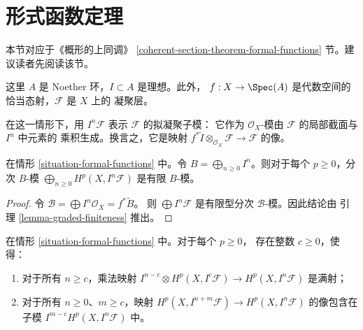 \section{形式函数定理}
\label{section-theorem-formal-functions}

\noindent
本节对应于《概形的上同调》
\ref{coherent-section-theorem-formal-functions} 节。建议读者先阅读该节。

\begin{situation}
\label{situation-formal-functions}
这里 $A$ 是 Noether 环，$I \subset A$ 是理想。此外，
$f : X \to \Spec(A)$ 是代数空间的恰当态射，$\mathcal{F}$ 是 $X$ 上的
凝聚层。
\end{situation}

\noindent
在这一情形下，用 $I^n\mathcal{F}$ 表示 $\mathcal{F}$ 的拟凝聚子模：
它作为 $\mathcal{O}_X$-模由 $\mathcal{F}$ 的局部截面与 $I^n$ 中元素的
乘积生成。换言之，它是映射
$f^*\widetilde{I} \otimes_{\mathcal{O}_X} \mathcal{F} \to \mathcal{F}$ 的像。

\begin{lemma}
\label{lemma-cohomology-powers-ideal-times-F}
在情形 \ref{situation-formal-functions} 中。令
$B = \bigoplus_{n \geq 0} I^n$。则对于每个 $p \geq 0$，分次 $B$-模
$\bigoplus_{n \geq 0} H^p(X, I^n\mathcal{F})$ 是有限 $B$-模。
\end{lemma}

\begin{proof}
令 $\mathcal{B} = \bigoplus I^n\mathcal{O}_X = f^*\widetilde{B}$。
则 $\bigoplus I^n\mathcal{F}$ 是有限型分次 $\mathcal{B}$-模。因此结论由
引理 \ref{lemma-graded-finiteness} 推出。
\end{proof}

\begin{lemma}
\label{lemma-cohomology-powers-ideal-application}
在情形 \ref{situation-formal-functions} 中。对于每个 $p \geq 0$，
存在整数 $c \geq 0$，使得：
\begin{enumerate}
\item 对于所有 $n \geq c$，乘法映射
$I^{n - c} \otimes H^p(X, I^c\mathcal{F}) \to H^p(X, I^n\mathcal{F})$
是满射；
\item 对于所有 $n \geq 0$、$m \geq c$，映射
$H^p(X, I^{n + m}\mathcal{F}) \to H^p(X, I^n\mathcal{F})$ 的像包含在
子模 $I^{m - c} H^p(X, I^n\mathcal{F})$ 中。
\end{enumerate}
\end{lemma}

